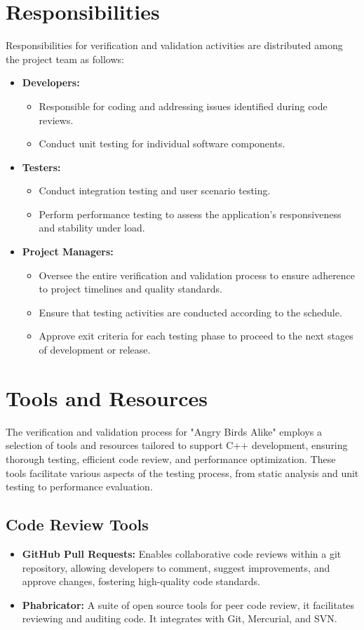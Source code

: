 \documentclass[12pt]{article}
\begin{document}
\section{Responsibilities}
Responsibilities for verification and validation activities are distributed among the project team as follows:
\begin{itemize}
    \item \textbf{Developers:}
    \begin{itemize}
        \item Responsible for coding and addressing issues identified during code reviews.
        \item Conduct unit testing for individual software components.
    \end{itemize}
    \item \textbf{Testers:}
    \begin{itemize}
        \item Conduct integration testing and user scenario testing.
        \item Perform performance testing to assess the application's responsiveness and stability under load.
    \end{itemize}
    \item \textbf{Project Managers:}
    \begin{itemize}
        \item Oversee the entire verification and validation process to ensure adherence to project timelines and quality standards.
        \item Ensure that testing activities are conducted according to the schedule.
        \item Approve exit criteria for each testing phase to proceed to the next stages of development or release.
    \end{itemize}
\end{itemize}

\section{Tools and Resources}
The verification and validation process for "Angry Birds Alike" employs a selection of tools and resources tailored to support C++ development, ensuring thorough testing, efficient code review, and performance optimization. These tools facilitate various aspects of the testing process, from static analysis and unit testing to performance evaluation.

\subsection{Code Review Tools}
\begin{itemize}
    \item \textbf{GitHub Pull Requests:} Enables collaborative code reviews within a git repository, allowing developers to comment, suggest improvements, and approve changes, fostering high-quality code standards.
    \item \textbf{Phabricator:} A suite of open source tools for peer code review, it facilitates reviewing and auditing code. It integrates with Git, Mercurial, and SVN.
\end{itemize}
\end{document}

